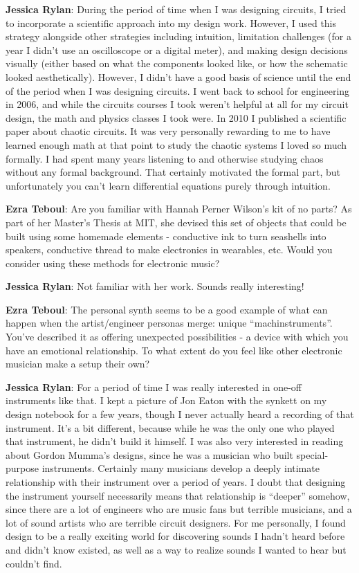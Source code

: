 \textbf{Jessica Rylan}: During the period of time when I was designing circuits, I tried to incorporate a scientific approach into my design work. However, I used this strategy alongside other strategies including intuition, limitation challenges (for a year I didn't use an oscilloscope or a digital meter), and making design decisions visually (either based on what the components looked like, or how the schematic looked aesthetically). However, I didn't have a good basis of science until the end of the period when I was designing circuits. I went back to school for engineering in 2006, and while the circuits courses I took weren't helpful at all for my circuit design, the math and physics classes I took were. In 2010 I published a scientific paper about chaotic circuits. It was very personally rewarding to me to have learned enough math at that point to study the chaotic systems I loved so much formally. I had spent many years listening to and otherwise studying chaos without any formal background. That certainly motivated the formal part, but unfortunately you can't learn differential equations purely through intuition.

\textbf{Ezra Teboul}: Are you familiar with Hannah Perner Wilson’s kit of no parts? As part of her Master’s Thesis at MIT, she devised this set of objects that could be built using some homemade elements - conductive ink to turn seashells into speakers, conductive thread to make electronics in wearables, etc. Would you consider using these methods for electronic music?
 
\textbf{Jessica Rylan}: Not familiar with her work. Sounds really interesting! 
 
\textbf{Ezra Teboul}: The personal synth seems to be a good example of what can happen when the artist/engineer personas merge: unique ``machinstruments''. You've described it as offering unexpected possibilities - a device with which you have an emotional relationship. To what extent do you feel like other electronic musician make a setup their own? 
             
\textbf{Jessica Rylan}: For a period of time I was really interested in one-off instruments like that. I kept a picture of Jon Eaton with the synkett on my design notebook for a few years, though I never actually heard a recording of that instrument. It's a bit different, because while he was the only one who played that instrument, he didn't build it himself. I was also very interested in reading about Gordon Mumma's designs, since he was a musician who built special-purpose instruments. Certainly many musicians develop a deeply intimate relationship with their instrument over a period of years. I doubt that designing the instrument yourself necessarily means that relationship is ``deeper'' somehow, since there are a lot of engineers who are music fans but terrible musicians, and a lot of sound artists who are terrible circuit designers. For me personally, I found design to be a really exciting world for discovering sounds I hadn't heard before and didn't know existed, as well as a way to realize sounds I wanted to hear but couldn't find.

